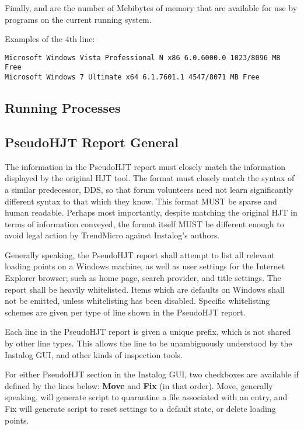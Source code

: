 Finally,  and  are the number of Mebibytes of memory
that are available for use by programs on the current running system.

Examples of the 4th line:
\begin{verbatim}
Microsoft Windows Vista Professional N x86 6.0.6000.0 1023/8096 MB Free
Microsoft Windows 7 Ultimate x64 6.1.7601.1 4547/8071 MB Free
\end{verbatim}

\subsection{Running Processes}

\subsection{PseudoHJT Report General}
The information in the PseudoHJT report must closely match the information
displayed by the original HJT tool. The format must closely match the syntax of
a similar predecessor, DDS, so that forum volunteers need not learn
significantly different syntax to that which they know. This format MUST be
sparse and human readable. Perhaps most importantly, despite matching the
original HJT in terms of information conveyed, the format itself MUST be
different enough to avoid legal action by TrendMicro against Instalog's authors.

Generally speaking, the PseudoHJT report shall attempt to list all relevant
loading points on a Windows machine, as well as user settings for the Internet
Explorer browser; such as home page, search provider, and title settings. The
report shall be heavily whitelisted. Items which are defaults on Windows shall
not be emitted, unless whitelisting has been disabled. Specific whitelisting
schemes are given per type of line shown in the PseudoHJT report.

Each line in the PseudoHJT report is given a unique prefix, which is not shared
by other line types. This allows the line to be unambiguously understood by the
Instalog GUI, and other kinds of inspection tools.

For either PseudoHJT section in the Instalog GUI, two checkboxes are available
if defined by the lines below: \textbf{Move} and \textbf{Fix} (in that order).
Move, generally speaking, will generate script to quarantine a file associated
with an entry, and Fix will generate script to reset settings to a default
state, or delete loading points.

